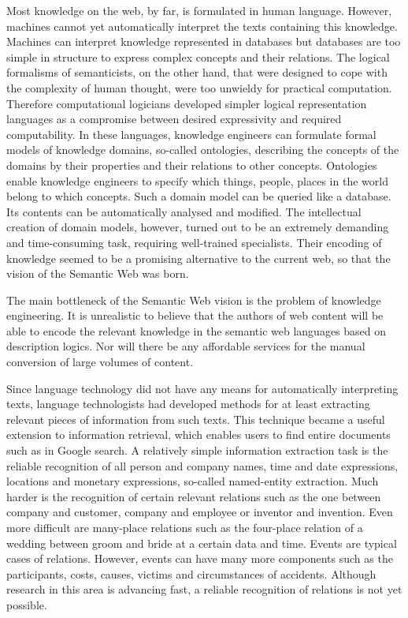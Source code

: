 \begin{multicols}{2}
Most knowledge on the web, by far, is formulated in human language. However, machines cannot yet automatically interpret the texts containing this knowledge. Machines can interpret knowledge represented in databases but databases are too simple in structure to express complex concepts and their relations. The logical formalisms of semanticists, on the other hand, that were designed to cope with the complexity of human thought, were too unwieldy for practical computation. Therefore computational logicians developed simpler logical representation languages as a compromise between desired expressivity and required computability. In these languages, knowledge engineers can formulate formal models of knowledge domains, so-called ontologies,  describing the concepts of the domains by their properties and their relations to other concepts. Ontologies enable knowledge engineers to specify which things, people, places in the world belong to which concepts. Such a domain model can be queried like a database. Its contents can be automatically analysed and modified. The intellectual creation of domain models, however, turned out to be an extremely demanding and time-consuming task, requiring well-trained specialists. Their encoding of knowledge seemed to be a promising alternative to the current web, so that the vision of the Semantic Web was born. 
 
The main bottleneck of the Semantic Web vision is the problem of knowledge engineering. It is unrealistic to believe that the authors of web content will be able to encode the relevant knowledge in the semantic web languages based on description logics. Nor will there be any affordable services for the manual conversion of large volumes of content.
 
Since language technology did not have any means for automatically interpreting texts, language technologists had developed methods for at least extracting relevant pieces of information from such texts. This technique became a useful extension to information retrieval, which enables users to find entire documents such as in Google search. A relatively simple information extraction task is the reliable recognition of all person and company names, time and date expressions, locations and monetary expressions, so-called named-entity extraction. Much harder is the recognition of certain relevant relations such as the one between company and customer, company and employee or inventor and invention. Even more difficult are many-place relations such as the four-place relation of a wedding between groom and bride at a certain data and time. Events are typical cases of relations. However, events can have many more components such as the participants, costs, causes, victims and circumstances of accidents. Although research in this area is advancing fast, a reliable recognition of relations is not yet possible.
 

\end{multicols}
